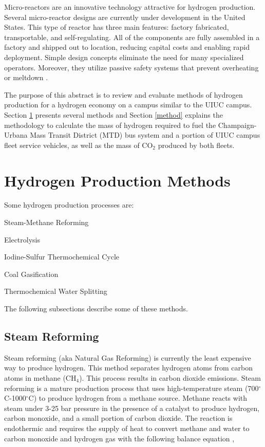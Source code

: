 \documentclass{anstrans}
\begin{document}
Micro-reactors are an innovative technology attractive for hydrogen production. Several micro-reactor designs are currently under development in the United States. This type of reactor has three main features: factory fabricated, transportable, and self-regulating. All of the components are fully assembled in a factory and shipped out to location, reducing capital costs and enabling rapid deployment. Simple design concepts eliminate the need for many specialized operators. Moreover, they utilize passive safety systems that prevent overheating or meltdown \cite{noauthor_ultimate_2019}.

The purpose of this abstract is to review and evaluate methods of hydrogen production for a hydrogen economy on a campus similar to the UIUC campus.
Section \ref{section:hydroprod} presents several methods and Section \ref{method} explains the methodology to calculate the mass of hydrogen required to fuel the Champaign-Urbana Mass Transit District (MTD) bus system and a portion of UIUC campus fleet service vehicles, as well as the mass of CO$_2$ produced by both fleets.

\section{Hydrogen Production Methods}
\label{section:hydroprod}

Some hydrogen production processes are: 
\begin{description}[font=$\bullet$\scshape\bfseries]
	\item[] Steam-Methane Reforming \cite{noauthor_hydrogen_nodate}
	\item[] Electrolysis \cite{noauthor_hydrogen_nodate}
	\item[] Iodine-Sulfur Thermochemical Cycle \cite{cea_gas-cooled_2006}
	\item[] Coal Gasification \cite{office_of_energy_efficiency_and_renewable_energy_coal_gas_2020}
	\item[] Thermochemical Water Splitting \cite{office_of_energy_efficiency_and_renewable_energy_thermo_water_2020}
\end{description}

The following subsections describe some of these methods.

\subsection{Steam Reforming}

Steam reforming (aka Natural Gas Reforming) is currently the least expensive way to produce hydrogen. This method separates hydrogen atoms from carbon atoms in methane (CH$_4$). This process results in carbon dioxide emissions.
Steam reforming is a mature production process that uses high-temperature steam (700$^{\circ}$C-1000$^{\circ}$C) to produce hydrogen from a methane source. Methane reacts with steam under 3-25 bar pressure in the presence of a catalyst to produce hydrogen, carbon monoxide, and a small portion of carbon dioxide. The reaction is endothermic and requires the supply of heat to convert methane and water to carbon monoxide and hydrogen gas with the following balance equation \cite{noauthor_hydrogen_nodate},
\end{document}
